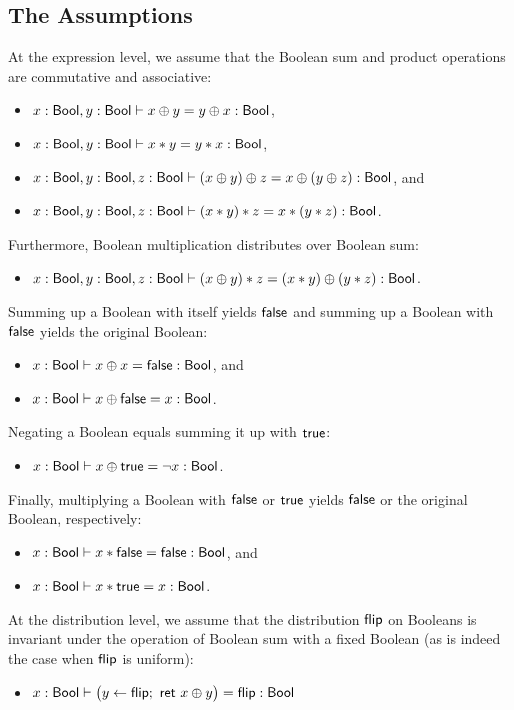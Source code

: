 \subsection{The Assumptions}
At the expression level, we assume that the Boolean sum and product operations are commutative and associative:
\begin{itemize}
\item $x : \mathsf{Bool}, y : \mathsf{Bool} \vdash x \oplus y = y \oplus x : \mathsf{Bool}$,
\item $x : \mathsf{Bool}, y : \mathsf{Bool} \vdash x * y = y * x : \mathsf{Bool}$,
\item $x : \mathsf{Bool}, y : \mathsf{Bool}, z : \mathsf{Bool} \vdash (x \oplus y) \oplus z = x \oplus (y \oplus z) : \mathsf{Bool}$, and
\item $x : \mathsf{Bool}, y : \mathsf{Bool}, z : \mathsf{Bool} \vdash (x * y) * z = x * (y * z) : \mathsf{Bool}$.
\end{itemize}
Furthermore, Boolean multiplication distributes over Boolean sum:
\begin{itemize}
\item $x : \mathsf{Bool}, y : \mathsf{Bool}, z : \mathsf{Bool} \vdash (x \oplus y) * z = (x * y) \oplus (y * z) : \mathsf{Bool}$.
\end{itemize}
Summing up a Boolean with itself yields $\mathsf{false}$ and summing up a Boolean with $\mathsf{false}$ yields the original Boolean:
\begin{itemize}
\item $x : \mathsf{Bool} \vdash x \oplus x = \mathsf{false} : \mathsf{Bool}$, and
\item $x : \mathsf{Bool} \vdash x \oplus \mathsf{false} = x : \mathsf{Bool}$.
\end{itemize}
Negating a Boolean equals summing it up with $\mathsf{true}$:
\begin{itemize}
\item $x : \mathsf{Bool} \vdash x \oplus \mathsf{true} = \neg x : \mathsf{Bool}$.
\end{itemize}
Finally, multiplying a Boolean with $\mathsf{false}$ or $\mathsf{true}$ yields $\mathsf{false}$ or the original Boolean, respectively:
\begin{itemize}
\item $x : \mathsf{Bool} \vdash x * \mathsf{false} = \mathsf{false} : \mathsf{Bool}$, and
\item $x : \mathsf{Bool} \vdash x * \mathsf{true} = x : \mathsf{Bool}$.
\end{itemize}
At the distribution level, we assume that the distribution $\mathsf{flip}$ on Booleans is invariant under the operation of Boolean sum with a fixed Boolean (as is indeed the case when $\mathsf{flip}$ is uniform):
\begin{itemize}
\item $x : \mathsf{Bool} \vdash \big(y \leftarrow \mathsf{flip}; \ \mathsf{ret} \ x \oplus y\big) = \mathsf{flip} : \mathsf{Bool}$
\end{itemize}

